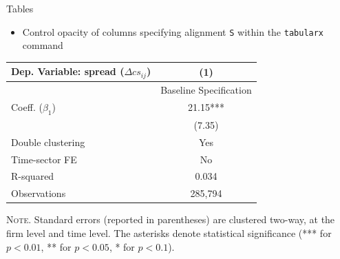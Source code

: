 \documentclass[10pt,itemsep]{beamer}
\begin{document}
\begin{frame}
    {Tables}
    \begin{itemize}
        \item Control opacity of columns specifying alignment \texttt{S} within the \texttt{tabularx} command 
    \end{itemize}
    \begin{table}[th]
        \centering%
        \begin{minipage}[b]{.5\textwidth}
            \vspace{.2cm}\tablesize
            \begin{tabularx}{\textwidth}{lS}
                \toprule
                Dep. Variable: spread ($\Delta cs_{ij}$) 	& (1)\\
                \midrule
                & {Baseline Specification} \\
                \midrule
                 Coeff. ($\beta_1$) 		&  21.15*** \\
                &   (7.35) \\
                \midrule
                 Double clustering 		& Yes \\
                Time-sector FE 												& No \\
                 R-squared 					& 0.034 \\
                Observations 												& 285,794 \\\bottomrule
            \end{tabularx}\vspace{.2cm}\newline
            \tiny{{\scshape Note.} Standard errors (reported in parentheses) are clustered two-way, at the firm level and time level. The asterisks denote statistical significance (*** for $p<0.01$, ** for $p<0.05$, * for $p<0.1$).\newline}%
            \label{tab:label3}%
        \end{minipage}
    \end{table}
\end{frame}
\shownotesblock{}
\end{document}

